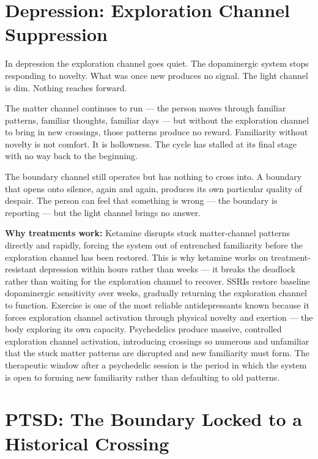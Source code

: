 \documentclass[12pt]{article}
\begin{document}
\section{Depression: Exploration Channel Suppression}

In depression the exploration channel goes quiet. The dopaminergic system stops
responding to novelty. What was once new produces no signal. The light channel is
dim. Nothing reaches forward.

The matter channel continues to run --- the person moves through familiar
patterns, familiar thoughts, familiar days --- but without the exploration channel
to bring in new crossings, those patterns produce no reward. Familiarity without
novelty is not comfort. It is hollowness. The cycle has stalled at its final
stage with no way back to the beginning.

The boundary channel still operates but has nothing to cross into. A boundary
that opens onto silence, again and again, produces its own particular quality of
despair. The person can feel that something is wrong --- the boundary is
reporting --- but the light channel brings no answer.

\textbf{Why treatments work:}
Ketamine disrupts stuck matter-channel patterns directly and rapidly, forcing the
system out of entrenched familiarity before the exploration channel has been
restored. This is why ketamine works on treatment-resistant depression within
hours rather than weeks --- it breaks the deadlock rather than waiting for the
exploration channel to recover. SSRIs restore baseline dopaminergic sensitivity
over weeks, gradually returning the exploration channel to function. Exercise is
one of the most reliable antidepressants known because it forces exploration
channel activation through physical novelty and exertion --- the body exploring
its own capacity. Psychedelics produce massive, controlled exploration channel
activation, introducing crossings so numerous and unfamiliar that the stuck
matter patterns are disrupted and new familiarity must form. The therapeutic
window after a psychedelic session is the period in which the system is open to
forming new familiarity rather than defaulting to old patterns.

\section{PTSD: The Boundary Locked to a Historical Crossing}
\end{document}
